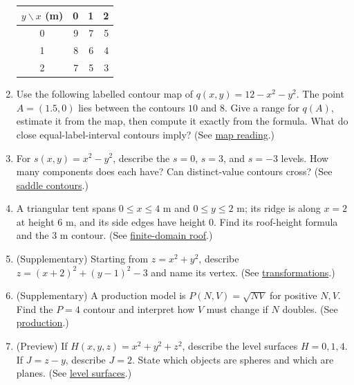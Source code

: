 \begin{enumerate}[label=\textbf{Q\arabic*.},leftmargin=*]
\begin{center}\begin{tabular}{c|rrr}\toprule $y\backslash x$ (m)&0&1&2\\\midrule0&9&7&5\\1&8&6&4\\2&7&5&3\\\bottomrule\end{tabular}\end{center}
\item Use the following labelled contour map of $q(x,y)=12-x^2-y^2$. The point $A=(1.5,0)$ lies between the contours $10$ and $8$. Give a range for $q(A)$, estimate it from the map, then compute it exactly from the formula. What do close equal-label-interval contours imply? (See \hyperref[estimate]{map reading}.)
\item For $s(x,y)=x^2-y^2$, describe the $s=0$, $s=3$, and $s=-3$ levels. How many components does each have? Can distinct-value contours cross? (See \hyperref[saddle]{saddle contours}.)
\item A triangular tent spans $0\leq x\leq4$ m and $0\leq y\leq2$ m; its ridge is along $x=2$ at height $6$ m, and its side edges have height $0$. Find its roof-height formula and the $3$ m contour. (See \hyperref[tent]{finite-domain roof}.)
\item (Supplementary) Starting from $z=x^2+y^2$, describe $z=(x+2)^2+(y-1)^2-3$ and name its vertex. (See \hyperref[transform]{transformations}.)
\item (Supplementary) A production model is $P(N,V)=\sqrt{NV}$ for positive $N,V$. Find the $P=4$ contour and interpret how $V$ must change if $N$ doubles. (See \hyperref[supplement]{production}.)
\item (Preview) If $H(x,y,z)=x^2+y^2+z^2$, describe the level surfaces $H=0,1,4$. If $J=z-y$, describe $J=2$. State which objects are spheres and which are planes. (See \hyperref[preview]{level surfaces}.)
\end{enumerate}
